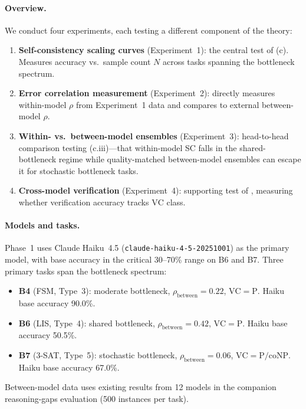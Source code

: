 \documentclass{article}
\theoremstyle{definition}
\theoremstyle{remark}
\newcommand{\PTIME}{\mathrm{P}}
\newcommand{\coNP}{\mathrm{coNP}}
\newcommand{\VC}{\mathrm{VC}}           %
\begin{document}
\paragraph{Overview.}
We conduct four experiments, each testing a different component of the theory:
\begin{enumerate}[leftmargin=*,itemsep=1pt]
    \item \textbf{Self-consistency scaling curves} (Experiment~1): the central test of (c). Measures accuracy vs.\ sample count $N$ across tasks spanning the bottleneck spectrum.
    \item \textbf{Error correlation measurement} (Experiment~2): directly measures within-model $\rho$ from Experiment~1 data and compares to external between-model $\rho$.
    \item \textbf{Within- vs.\ between-model ensembles} (Experiment~3): head-to-head comparison testing (c.iii)---that within-model SC falls in the shared-bottleneck regime while quality-matched between-model ensembles can escape it for stochastic bottleneck tasks.
    \item \textbf{Cross-model verification} (Experiment~4): supporting test of , measuring whether verification accuracy tracks $\VC$ class.
\end{enumerate}

\paragraph{Models and tasks.}
Phase~1 uses Claude Haiku~4.5 (\texttt{claude-haiku-4-5-20251001}) as the primary model, with base accuracy in the critical 30--70\% range on B6 and B7.
Three primary tasks span the bottleneck spectrum:
\begin{itemize}[leftmargin=*,itemsep=1pt]
    \item \textbf{B4} (FSM, Type~3): moderate bottleneck, $\rho_{\text{between}} = 0.22$, $\VC = \PTIME$. Haiku base accuracy 90.0\%.
    \item \textbf{B6} (LIS, Type~4): shared bottleneck, $\rho_{\text{between}} = 0.42$, $\VC = \PTIME$. Haiku base accuracy 50.5\%.
    \item \textbf{B7} (3-SAT, Type~5): stochastic bottleneck, $\rho_{\text{between}} = 0.06$, $\VC = \PTIME/\coNP$. Haiku base accuracy 67.0\%.
\end{itemize}
Between-model data uses existing results from 12 models in the companion reasoning-gaps evaluation (500 instances per task).
\end{document}
